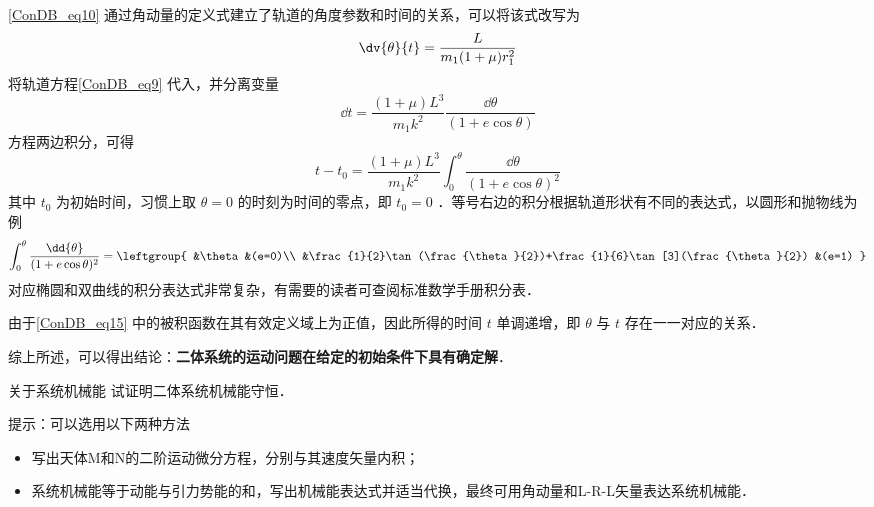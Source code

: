 \autoref{ConDB_eq10} 通过角动量的定义式建立了轨道的角度参数和时间的关系，可以将该式改写为
\begin{equation}
\dv{\theta}{t}=\frac{L}{ m_1(1+\mu)r_1^2}
\end{equation}
将轨道方程\autoref{ConDB_eq9} 代入，并分离变量
\begin{equation}
\dd{t}=\frac{(1+\mu)L^3}{ m_1k^2}\frac{\dd{\theta}}{(1+e\cos\theta)}
\end{equation}
方程两边积分，可得
\begin{equation}\label{ConDB_eq15}
t-t_0 = \frac{(1+\mu)L^3}{ m_1k^2}\int_0^{\theta} \frac{\dd{\theta}}{(1+e\cos\theta)^2}
\end{equation}
其中 $t_0$ 为初始时间，习惯上取 $\theta=0$ 的时刻为时间的零点，即 $t_0=0$ ．等号右边的积分根据轨道形状有不同的表达式，以圆形和抛物线为例
\begin{equation}
\int_0^{\theta} \frac{\dd{\theta}}{(1+e\cos\theta)^2} =
\leftgroup{
&\theta &(e=0)\\
&\frac{1}{2}\tan(\frac{\theta}{2})+\frac{1}{6}\tan[3](\frac{\theta}{2}) &(e=1)
} 
\end{equation}
对应椭圆和双曲线的积分表达式非常复杂，有需要的读者可查阅标准数学手册积分表．

由于\autoref{ConDB_eq15} 中的被积函数在其有效定义域上为正值，因此所得的时间 $t$ 单调递增，即 $\theta$ 与 $t$ 存在一一对应的关系．

综上所述，可以得出结论：\textbf{二体系统的运动问题在给定的初始条件下具有确定解}．

\begin{exercise}{关于系统机械能}\label{ConDB_exe1}
试证明二体系统机械能守恒．

提示：可以选用以下两种方法
\begin{itemize}
\item 写出天体M和N的二阶运动微分方程，分别与其速度矢量内积；
\item 系统机械能等于动能与引力势能的和，写出机械能表达式并适当代换，最终可用角动量和L-R-L矢量表达系统机械能．
\end{itemize}
\end{exercise}
